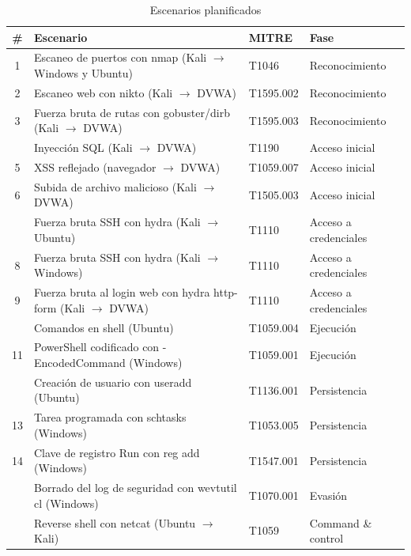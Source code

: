 \begin{table}[H]\centering\small
\begin{tabularx}{\linewidth}{c X l l}
  \toprule
  \textbf{\#} & \textbf{Escenario} & \textbf{MITRE} & \textbf{Fase} \\
  \midrule
  1  & Escaneo de puertos con nmap (Kali $\rightarrow$ Windows y Ubuntu) & T1046     & Reconocimiento \\
  2  & Escaneo web con nikto (Kali $\rightarrow$ DVWA)                          & T1595.002 & Reconocimiento \\
  3  & Fuerza bruta de rutas con gobuster/dirb (Kali $\rightarrow$ DVWA)        & T1595.003 & Reconocimiento \\
  \addlinespace
  4  & Inyección SQL (Kali $\rightarrow$ DVWA)              & T1190     & Acceso inicial \\
  5  & XSS reflejado (navegador $\rightarrow$ DVWA)                             & T1059.007 & Acceso inicial \\
  6  & Subida de archivo malicioso (Kali $\rightarrow$ DVWA)                    & T1505.003 & Acceso inicial \\
  \addlinespace
  7  & Fuerza bruta SSH con hydra (Kali $\rightarrow$ Ubuntu)                   & T1110     & Acceso a credenciales \\
  8  & Fuerza bruta SSH con hydra (Kali $\rightarrow$ Windows)                  & T1110     & Acceso a credenciales \\
  9  & Fuerza bruta al login web con hydra http-form (Kali $\rightarrow$ DVWA)  & T1110     & Acceso a credenciales \\
  \addlinespace
  10 & Comandos en shell (Ubuntu)                                   & T1059.004 & Ejecución \\
  11 & PowerShell codificado con -EncodedCommand (Windows)                      & T1059.001 & Ejecución \\
  \addlinespace
  12 & Creación de usuario con useradd (Ubuntu)                                 & T1136.001 & Persistencia \\
  13 & Tarea programada con schtasks (Windows)                                  & T1053.005 & Persistencia \\
  14 & Clave de registro Run con reg add (Windows)                              & T1547.001 & Persistencia \\
  \addlinespace
  15 & Borrado del log de seguridad con wevtutil cl (Windows)                   & T1070.001 & Evasión \\
  \addlinespace
  16 & Reverse shell con netcat (Ubuntu $\rightarrow$ Kali)                     & T1059     & Command \& control \\
  \bottomrule
\end{tabularx}
\caption{Escenarios planificados}\label{tab:resumen}
\end{table}